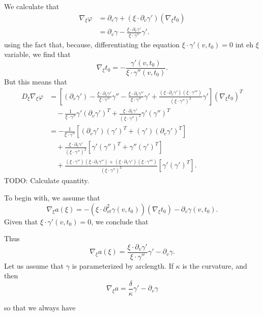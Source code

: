 \documentclass{article}
\theoremstyle{plain}
\theoremstyle{remark}
\theoremstyle{definition}
\begin{document}
We calculate that
%
\begin{align*}
	\nabla_\xi \varphi &= \partial_v \gamma + (\xi \cdot \partial_v \gamma') (\nabla_\xi t_0)\\
	&= \partial_v \gamma - \frac{\xi \cdot \partial_v \gamma'}{\xi \cdot \gamma''} \gamma'.
\end{align*}
%
using the fact that, because, differentiating the equation $\xi \cdot \gamma'(v,t_0) = 0$ int eh $\xi$ variable, we find that
%
\[ \nabla_\xi t_0 = - \frac{\gamma'(v,t_0)}{\xi \cdot \gamma''(v,t_0)}. \]
%
But this means that
%
\begin{align*}
	D_\xi \nabla_\xi \varphi &= \left[ (\partial_v \gamma') - \frac{\xi \cdot \partial_v \gamma'}{\xi \cdot \gamma''} \gamma'' - \frac{\xi \cdot \partial_v \gamma''}{\xi \cdot \gamma''} \gamma' + \frac{(\xi \cdot \partial_v \gamma')(\xi \cdot \gamma''')}{(\xi \cdot \gamma'')^2} \gamma' \right] (\nabla_\xi t_0)^T\\
	&\quad - \frac{1}{\xi \cdot \gamma''} \gamma' (\partial_v \gamma')^T + \frac{\xi \cdot \partial_v \gamma'}{(\xi \cdot \gamma'')^2} \gamma' (\gamma'')^T\\
	&= - \frac{1}{\xi \cdot \gamma''} [(\partial_v \gamma') (\gamma')^T + (\gamma') (\partial_v \gamma')^T]\\
	&\quad + \frac{\xi \cdot \partial_v \gamma'}{(\xi \cdot \gamma'')^2} [ \gamma' (\gamma'')^T + \gamma'' (\gamma')^T]\\
	&\quad + \frac{ (\xi \cdot \gamma'') (\xi \cdot \partial_v \gamma'') + (\xi \cdot \partial_v \gamma')(\xi \cdot \gamma''')}{(\xi \cdot \gamma'')^3} [\gamma' (\gamma')^T].
\end{align*}
%
TODO: Calculate quantity.




To begin with, we assume that
%
\[ \nabla_\xi a(\xi) = - (\xi \cdot \partial^2_{vt} \gamma(v,t_0)) (\nabla_\xi t_0) - \partial_v \gamma(v,t_0). \]
%
Given that $\xi \cdot \gamma'(v,t_0) = 0$, we conclude that
%

%
Thus
%
\[ \nabla_\xi a(\xi) = \frac{\xi \cdot \partial_v \gamma'}{\xi \cdot \gamma''} \gamma' - \partial_v \gamma. \]
%
Let us assume that $\gamma$ is parameterized by arclength. If $\kappa$ is the curvature, and then
%
\[ \nabla_\xi a = \frac{\delta}{\kappa} \gamma' - \partial_v \gamma \]

 so that we always have
%
\[  \]
\end{document}
